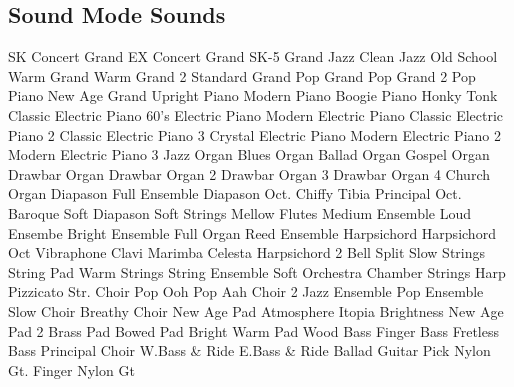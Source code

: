 \subsection{Sound Mode Sounds}
SK Concert Grand
EX Concert Grand
SK-5 Grand
Jazz Clean
Jazz Old School
Warm Grand
Warm Grand 2
Standard Grand
Pop Grand
Pop Grand 2
Pop Piano
New Age Grand
Upright Piano
Modern Piano
Boogie Piano
Honky Tonk
Classic Electric Piano
60's Electric Piano
Modern Electric Piano
Classic Electric Piano 2
Classic Electric Piano 3
Crystal Electric Piano
Modern Electric Piano 2
Modern Electric Piano 3
Jazz Organ
Blues Organ
Ballad Organ
Gospel Organ
Drawbar Organ
Drawbar Organ 2
Drawbar Organ 3
Drawbar Organ 4
Church Organ
Diapason
Full Ensemble
Diapason Oct.
Chiffy Tibia
Principal Oct.
Baroque
Soft Diapason
Soft Strings
Mellow Flutes
Medium Ensemble
Loud Ensembe
Bright Ensemble
Full Organ
Reed Ensemble
Harpsichord
Harpsichord Oct
Vibraphone
Clavi
Marimba
Celesta
Harpsichord 2
Bell Split
Slow Strings
String Pad
Warm Strings
String Ensemble
Soft Orchestra
Chamber Strings
Harp
Pizzicato Str.
Choir
Pop Ooh
Pop Aah
Choir 2
Jazz Ensemble
Pop Ensemble
Slow Choir
Breathy Choir
New Age Pad
Atmosphere
Itopia
Brightness
New Age Pad 2
Brass Pad
Bowed Pad
Bright Warm Pad
Wood Bass
Finger Bass
Fretless Bass
Principal Choir
W.Bass \& Ride
E.Bass \& Ride
Ballad Guitar
Pick Nylon Gt.
Finger Nylon Gt
